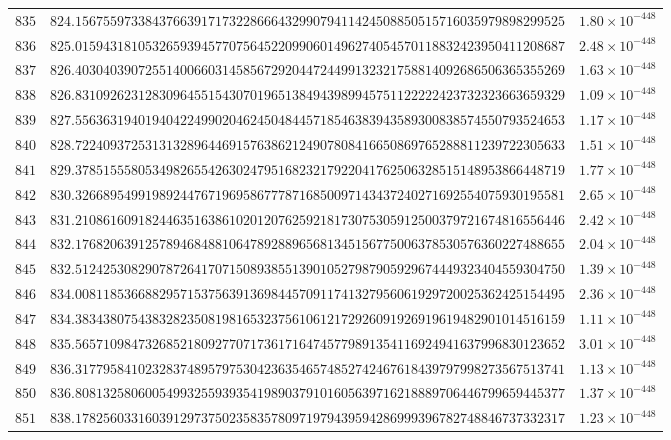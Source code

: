 \documentclass[12pt,reqno]{amsart}
\theoremstyle{remark}
\begin{document}
\begin{longtable}{clc}
$835$ & $824.1567559733843766391717322866643299079411424508850515716035979898299525$ & $1.80\times 10^{-448}$ \\
$836$ & $825.0159431810532659394577075645220990601496274054570118832423950411208687$ & $2.48\times 10^{-448}$ \\
$837$ & $826.4030403907255140066031458567292044724499132321758814092686506365355269$ & $1.63\times 10^{-448}$ \\
$838$ & $826.8310926231283096455154307019651384943989945751122222423732323663659329$ & $1.09\times 10^{-448}$ \\
$839$ & $827.5563631940194042249902046245048445718546383943589300838574550793524653$ & $1.17\times 10^{-448}$ \\
$840$ & $828.7224093725313132896446915763862124907808416650869765288811239722305633$ & $1.51\times 10^{-448}$ \\
$841$ & $829.3785155580534982655426302479516823217922041762506328515148953866448719$ & $1.77\times 10^{-448}$ \\
$842$ & $830.3266895499198924476719695867778716850097143437240271692554075930195581$ & $2.65\times 10^{-448}$ \\
$843$ & $831.2108616091824463516386102012076259218173075305912500379721674816556446$ & $2.42\times 10^{-448}$ \\
$844$ & $832.1768206391257894684881064789288965681345156775006378530576360227488655$ & $2.04\times 10^{-448}$ \\
$845$ & $832.5124253082907872641707150893855139010527987905929674449323404559304750$ & $1.39\times 10^{-448}$ \\
$846$ & $834.0081185366882957153756391369844570911741327956061929720025362425154495$ & $2.36\times 10^{-448}$ \\
$847$ & $834.3834380754383282350819816532375610612172926091926919619482901014516159$ & $1.11\times 10^{-448}$ \\
$848$ & $835.5657109847326852180927707173617164745779891354116924941637996830123652$ & $3.01\times 10^{-448}$ \\
$849$ & $836.3177958410232837489579753042363546574852742467618439797998273567513741$ & $1.13\times 10^{-448}$ \\
$850$ & $836.8081325806005499325593935419890379101605639716218889706446799659445377$ & $1.37\times 10^{-448}$ \\
$851$ & $838.1782560331603912973750235835780971979439594286999396782748846737332317$ & $1.23\times 10^{-448}$ \\

\end{longtable}
\end{document}
